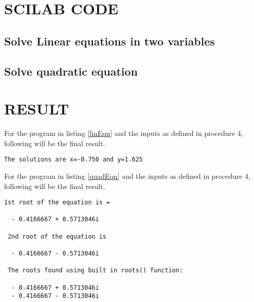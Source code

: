 \section*{SCILAB CODE}
\subsection*{Solve Linear equations in two variables}




\subsection{Solve quadratic equation}



\section*{RESULT}

For the program in listing \ref{linEqn} and the inputs as defined in procedure 4, following will be the final result.
\begin{lstlisting}[numbers=none]
The solutions are x=-0.750 and y=1.625
\end{lstlisting}



For the program in listing \ref{quadEqn} and the inputs as defined in procedure 4, following will be the final result.
\begin{lstlisting}[numbers=none]
1st root of the equation is =   
 
  - 0.4166667 + 0.5713046i  
 
 2nd root of the equation is   
 
  - 0.4166667 - 0.5713046i  
 
 The roots found using built in roots() function:   
 
  - 0.4166667 + 0.5713046i  
  - 0.4166667 - 0.5713046i
\end{lstlisting}



